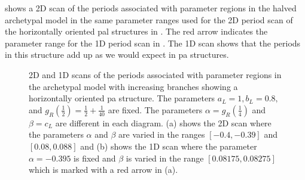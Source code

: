  shows a 2D scan of the periods associated with parameter regions in the halved archetypal model in the same parameter ranges used for the 2D period scan of the horizontally oriented \gls{pal} structures in .
The red arrow indicates the parameter range for the 1D period scan in .
The 1D scan shows that the periods in this structure add up as we would expect in \gls{pa} structures.

\begin{figure}
	\centering
	\caption[2D and 1D scans of the periods associated with parameter regions in the halved archetypal model with increasing branches showing a horizontally oriented period-adding-like structure]{
		2D and 1D scans of the periods associated with parameter regions in the archetypal model with increasing branches showing a horizontally oriented \gls{pa} structure.
		The parameters $a_L = 1, b_L = 0.8,$ and $g_R\left(\frac{1}{2}\right) = \frac{1}{2} + \frac{1}{40}$ are fixed.
		The parameters $\alpha = g_R\left(\frac{1}{4}\right)$ and $\beta = c_L$ are different in each diagram.
		(a) shows the 2D scan where the parameters $\alpha$ and $\beta$ are varied in the ranges $[-0.4, -0.39]$ and $[0.08, 0.088]$
		and (b) shows the 1D scan where the parameter $\alpha = -0.395$ is fixed and $\beta$ is varied in the range $[0.08175, 0.08275]$ which is marked with a red arrow in (a).
	}
	\label{fig:add.add.halved.hor}
\end{figure}

